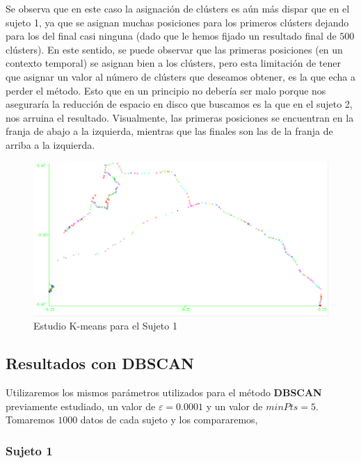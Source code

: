 \documentclass[a4paper, 12pt]{article}
\begin{document}
Se observa que en este caso la asignaci\'on de cl\'usters es a\'un m\'as dispar que en el sujeto 1, ya que se asignan muchas posiciones para los primeros cl\'usters dejando para los del final casi ninguna (dado que le hemos fijado un resultado final de $500$ cl\'usters). En este sentido, se puede observar que las primeras posiciones (en un contexto temporal) se asignan bien a los cl\'usters, pero esta limitaci\'on de tener que asignar un valor al n\'umero de cl\'usters que deseamos obtener, es la que echa a perder el m\'etodo. Esto que en un principio no deber\'ia ser malo porque nos asegurar\'ia la reducci\'on de espacio en disco que buscamos es la que en el sujeto 2, nos arruina el resultado. Visualmente, las primeras posiciones se encuentran en la franja de abajo a la izquierda, mientras que las finales son las de la franja de arriba a la izquierda. \\

\begin{figure}[H]
	\includegraphics[scale=.5]{../comparativa/kMeansSujeto2.png}
	\caption{Estudio K-means para el Sujeto 1}
\end{figure}

\subsection{Resultados con DBSCAN}

Utilizaremos los mismos par\'ametros utilizados para el m\'etodo \textbf{DBSCAN} previamente estudiado, un valor de $\varepsilon = 0.0001$ y un valor de $minPts = 5$. Tomaremos $1000$ datos de cada sujeto y los compararemos,\\

\subsubsection{Sujeto 1}
\end{document}
